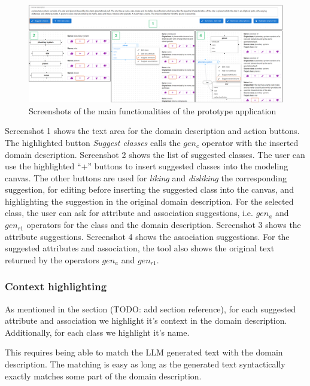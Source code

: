 \begin{figure}[!h]
    \centering
    \includegraphics[scale=0.22]{img/assistant-features.png}
    \caption{\centering Screenshots of the main functionalities of the prototype application}
    \label{fig:assistant-features}
\end{figure}

Screenshot 1 shows the text area for the domain description and action buttons. The highlighted button \textit{Suggest classes} calls the $gen_c$ operator with the inserted domain description. Screenshot 2 shows the list of suggested classes. The user can use the highlighted ``+'' buttons to insert suggested classes into the modeling canvas. The other buttons are used for \textit{liking} and \textit{disliking} the corresponding suggestion, for editing before inserting the suggested class into the canvas, and highlighting the suggestion in the original domain description. For the selected class, the user can ask for attribute and association suggestions, i.e. $gen_a$ and $gen_{r1}$ operators for the class and the domain description. Screenshot 3 shows the attribute suggestions. Screenshot 4 shows the association suggestions. For the suggested attributes and association, the tool also shows the original text returned by the operators $gen_a$ and $gen_{r1}$.


\subsubsection{Context highlighting}

As mentioned in the section (TODO: add section reference), for each suggested attribute and association we highlight it's context in the domain description. Additionally, for each class we highlight it's name.

This requires being able to match the LLM generated text with the domain description. The matching is easy as long as the generated text syntactically exactly matches some part of the domain description. %

